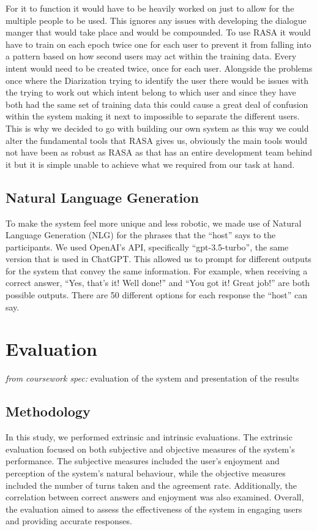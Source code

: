\documentclass[hidelinks, 11pt]{article}
\begin{document}
For it to function it would have to be heavily worked on just to allow for the multiple people to be used. This ignores any issues with developing the dialogue manger that would take place and would be compounded. To use RASA it would have to train on each epoch twice one for each user to prevent it from falling into a pattern based on how second users may act within the training data. Every intent would need to be created twice, once for each user. Alongside the problems once where the Diarization trying to identify the user there would be issues with the trying to work out which intent belong to which user and since they have both had the same set of training data this could cause a great deal of confusion within the system making it next to impossible to separate the different users. This is why we decided to go with building our own system as this way we could alter the fundamental tools that RASA gives us, obviously the main tools would not have been as robust as RASA as that has an entire development team behind it but it is simple unable to achieve what we required from our task at hand.

\subsection{Natural Language Generation}
\label{subsec:nlg}

To make the system feel more unique and less robotic, we made use of Natural Language Generation (NLG) for the phrases that the “host” says to the participants. We used OpenAI's API, specifically “gpt-3.5-turbo”, the same version that is used in ChatGPT. This allowed us to prompt for different outputs for the system that convey the same information. For example, when receiving a correct answer, “Yes, that's it! Well done!” and “You got it! Great job!” are both possible outputs. There are 50 different options for each response the “host” can say.


\section{Evaluation}
\label{sec:evaluation}

\textit{from coursework spec:} evaluation of the system and presentation of the results

\subsection{Methodology}
\label{subsec:methodology}
In this study, we performed extrinsic and intrinsic evaluations. The extrinsic evaluation focused on both subjective and objective measures of the system's performance. The subjective measures included the user's enjoyment and perception of the system's natural behaviour, while the objective measures included the number of turns taken and the agreement rate. Additionally, the correlation between correct answers and enjoyment was also examined. Overall, the evaluation aimed to assess the effectiveness of the system in engaging users and providing accurate responses.
\end{document}
